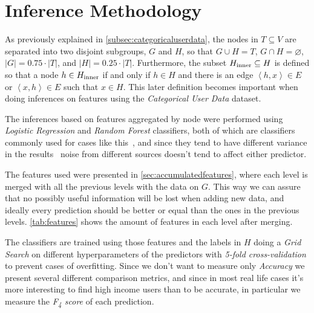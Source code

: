 

\section{Inference Methodology}
\label{sec:inference_methodology}

As previously explained in \cref{subsec:categoricaluserdata}, the nodes in $T \subseteq V$ are separated into two disjoint subgroups, $G$ and $H$, so that $G \cup H = T$, $G \cap H = \varnothing$, $\left| G \right| = 0.75 \cdot \left| T \right|$, and $\left| H \right| = 0.25 \cdot \left| T \right|$. Furthermore, the subset $H_{\operatorname{inner}} \subseteq H$ is defined so that a node $h \in H_{\operatorname{inner}}$ if and only if $h \in H$ and there is an edge $\left< h, x \right> \in E$ or $\left< x, h \right> \in E$ such that $x \in H$. %
This later definition becomes important when doing inferences on features using the \emph{Categorical User Data} dataset.


The inferences based on features aggregated by node were performed using \emph{Logistic Regression} and \emph{Random Forest} classifiers, both of which are classifiers commonly used for cases like this~\cite{binaryevaluation}, and since they tend to have different variance in the results~\cite{ting2016} noise from different sources doesn't tend to affect either predictor.

The features used were presented in \cref{sec:accumulatedfeatures}, where each level is merged with all the previous levels with the data on $G$. This way we can assure that no possibly useful information will be lost when adding new data, and ideally every prediction should be better or equal than the ones in the previous levels. \cref{tab:features} shows the amount of features in each level after merging.

The classifiers are trained using those features and the labels in $H$ doing a \emph{Grid Search} on different hyperparameters of the predictors with \emph{5-fold cross-validation} to prevent cases of overfitting. Since we don't want to measure only \emph{Accuracy} we present several different comparison metrics, and since in most real life cases it's more interesting to find high income users than to be accurate\footnotemark{}, in particular we measure the \emph{F\textsubscript{4} score} of each prediction.


